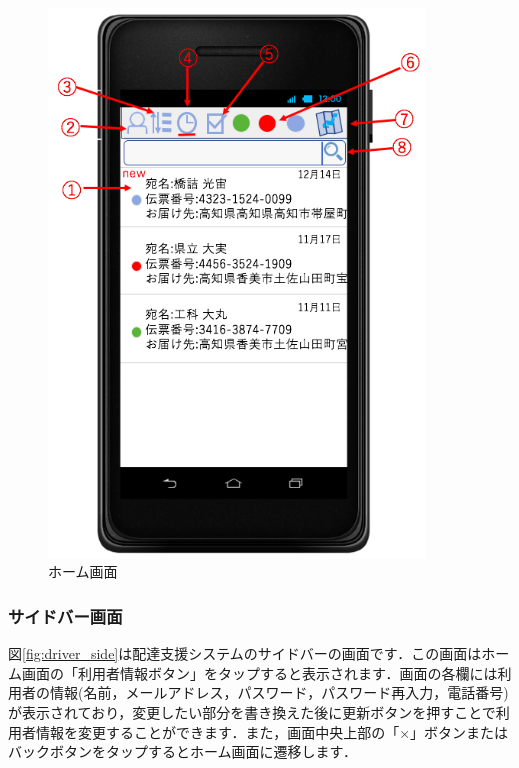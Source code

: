 \documentclass[a4j,titlepage]{jarticle}
\begin{document}
\begin{figure}[H]
 \begin{center}
  \includegraphics[width=100mm]{driver_home.png}
	\caption{ホーム画面}
	\label{fig:driver_home}
 \end{center}

\end{figure}



\newpage
\subsubsection{サイドバー画面}
図\ref{fig:driver_side}は配達支援システムのサイドバーの画面です．この画面はホーム画面の「利用者情報ボタン」をタップすると表示されます．画面の各欄には利用者の情報(名前，メールアドレス，パスワード，パスワード再入力，電話番号)が表示されており，変更したい部分を書き換えた後に更新ボタンを押すことで利用者情報を変更することができます．また，画面中央上部の「×」ボタンまたはバックボタンをタップするとホーム画面に遷移します．
\end{document}
